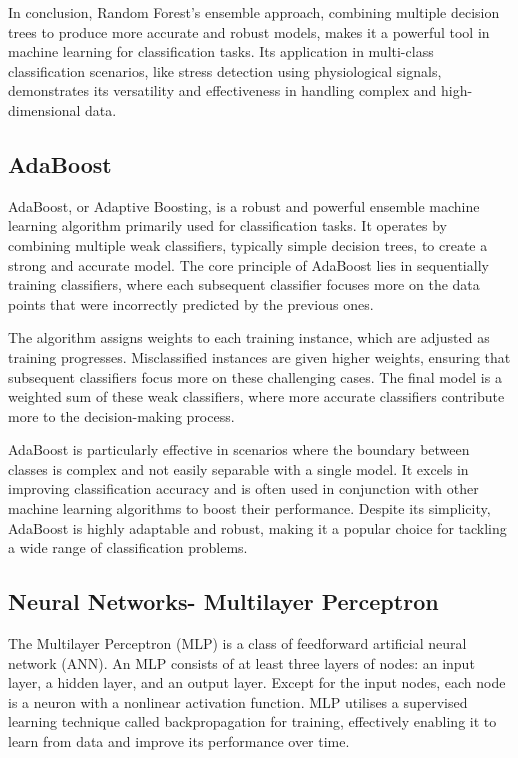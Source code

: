 In conclusion, Random Forest's ensemble approach, combining multiple decision trees to produce more accurate and robust models, makes it a powerful tool in machine learning for classification tasks. Its application in multi-class classification scenarios, like stress detection using physiological signals, demonstrates its versatility and effectiveness in handling complex and high-dimensional data.

\subsection*{AdaBoost}

AdaBoost, or Adaptive Boosting, is a robust and powerful ensemble machine learning algorithm primarily used for classification tasks. It operates by combining multiple weak classifiers, typically simple decision trees, to create a strong and accurate model. The core principle of AdaBoost lies in sequentially training classifiers, where each subsequent classifier focuses more on the data points that were incorrectly predicted by the previous ones.

The algorithm assigns weights to each training instance, which are adjusted as training progresses. Misclassified instances are given higher weights, ensuring that subsequent classifiers focus more on these challenging cases. The final model is a weighted sum of these weak classifiers, where more accurate classifiers contribute more to the decision-making process.

AdaBoost is particularly effective in scenarios where the boundary between classes is complex and not easily separable with a single model. It excels in improving classification accuracy and is often used in conjunction with other machine learning algorithms to boost their performance. Despite its simplicity, AdaBoost is highly adaptable and robust, making it a popular choice for tackling a wide range of classification problems.

\subsection*{Neural Networks- Multilayer Perceptron}

The Multilayer Perceptron (MLP) is a class of feedforward artificial neural network (ANN). An MLP consists of at least three layers of nodes: an input layer, a hidden layer, and an output layer. Except for the input nodes, each node is a neuron with a nonlinear activation function. MLP utilises a supervised learning technique called backpropagation for training, effectively enabling it to learn from data and improve its performance over time.

